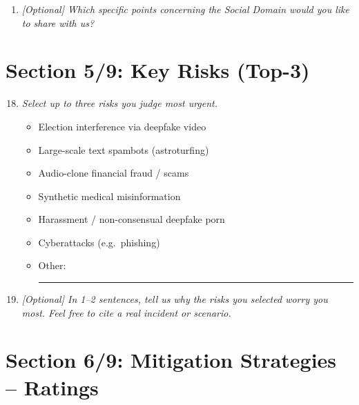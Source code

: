 \begin{enumerate}[label=\textbf{Q\arabic*.}, leftmargin=3em]
    \item \textit{[Optional] Which specific points concerning the Social Domain would you like to share with us?}\\[2pt]
    \framebox[\linewidth]{\rule{0pt}{2em}}

\end{enumerate}

\section*{Section 5/9: Key Risks (Top-3)}

\begin{enumerate}[label=\textbf{Q\arabic*.}, leftmargin=3em]
\setcounter{enumi}{17}

    \item[*] \textit{Select up to three risks you judge most urgent.}
    \begin{itemize}
        \item[$\square$] Election interference via deepfake video
        \item[$\square$] Large-scale text spambots (astroturfing)
        \item[$\square$] Audio-clone financial fraud / scams
        \item[$\square$] Synthetic medical misinformation
        \item[$\square$] Harassment / non-consensual deepfake porn
        \item[$\square$] Cyberattacks (e.g.\ phishing)
        \item[$\square$] Other: \rule{5cm}{0.4pt}
    \end{itemize}

    \item \textit{[Optional] In 1--2 sentences, tell us why the risks you selected worry you most. Feel free to cite a real incident or scenario.}\\[2pt]
    \framebox[\linewidth]{\rule{0pt}{2em}}

\end{enumerate}

\section*{Section 6/9: Mitigation Strategies -- Ratings}

